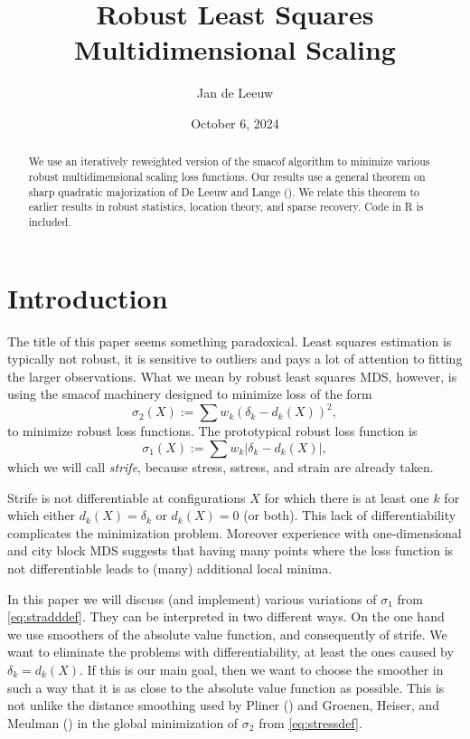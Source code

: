\documentclass[
  12pt,
  letterpaper,
  DIV=11,
  numbers=noendperiod]{scrartcl}
\title{Robust Least Squares Multidimensional Scaling}
\author{Jan de Leeuw}
\date{October 6, 2024}
\newcommand{\sectionbreak}{\pagebreak}
\renewcommand*\contentsname{Table of contents}
\newcommand\contentsname{Table of contents}
\theoremstyle{plain}
\theoremstyle{remark}
\begin{document}
\maketitle
\begin{abstract}
We use an iteratively reweighted version of the smacof algorithm to
minimize various robust multidimensional scaling loss functions. Our
results use a general theorem on sharp quadratic majorization of De
Leeuw and Lange (). We relate
this theorem to earlier results in robust statistics, location theory,
and sparse recovery. Code in R is included.
\end{abstract}

\renewcommand*\contentsname{Table of contents}
{
\hypersetup{linkcolor=}
\setcounter{tocdepth}{3}
\tableofcontents
}

\sectionbreak

\listoffigures

\sectionbreak

\section{Introduction}\label{introduction}

The title of this paper seems something paradoxical. Least squares
estimation is typically not robust, it is sensitive to outliers and pays
a lot of attention to fitting the larger observations. What we mean by
robust least squares MDS, however, is using the smacof machinery
designed to minimize loss of the form \begin{equation}
\sigma_2(X):=\sum w_k(\delta_k-d_k(X))^2\label{eq:stressdef},
\end{equation} to minimize robust loss functions. The prototypical
robust loss function is \begin{equation}
\sigma_1(X):=\sum w_k|\delta_k-d_k(X)|\label{eq:stradddef},
\end{equation} which we will call \emph{strife}, because stress,
sstress, and strain are already taken.

Strife is not differentiable at configurations \(X\) for which there is
at least one \(k\) for which either \(d_k(X)=\delta_k\) or \(d_k(X)=0\)
(or both). This lack of differentiability complicates the minimization
problem. Moreover experience with one-dimensional and city block MDS
suggests that having many points where the loss function is not
differentiable leads to (many) additional local minima.

In this paper we will discuss (and implement) various variations of
\(\sigma_1\) from \eqref{eq:stradddef}. They can be interpreted in two
different ways. On the one hand we use smoothers of the absolute value
function, and consequently of strife. We want to eliminate the problems
with differentiability, at least the ones caused by \(\delta_k=d_k(X)\).
If this is our main goal, then we want to choose the smoother in such a
way that it is as close to the absolute value function as possible. This
is not unlike the distance smoothing used by Pliner
() and Groenen, Heiser, and Meulman
() in the global
minimization of \(\sigma_2\) from \eqref{eq:stressdef}.
\end{document}
